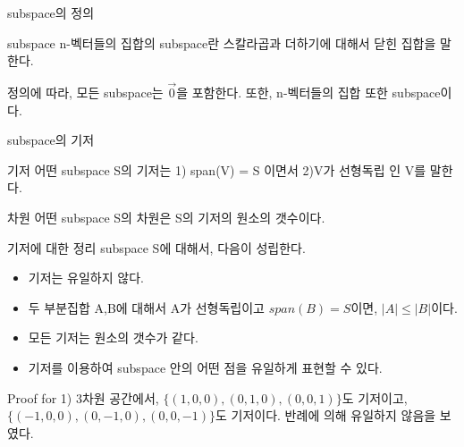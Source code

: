 \documentclass{beamer}
\begin{document}
\begin{frame}{subspace의 정의} 
\begin{block}{subspace}
n-벡터들의 집합의 subspace란 스칼라곱과 더하기에 대해서 닫힌 집합을 말한다. 
\end{block}

정의에 따라, 모든 subspace는 $\vec{0}$을 포함한다. 또한, n-벡터들의 집합 또한 subspace이다. 
\end{frame}


\begin{frame}{subspace의 기저} 
\begin{block}{기저} 
어떤 subspace S의 기저는 1) span(V) = S 이면서 2)V가 선형독립 인 V를 말한다. 
\end{block}
\begin{block}{차원} 
어떤 subspace S의 차원은 S의 기저의 원소의 갯수이다.
\end{block}
\end{frame}

\begin{frame}{기저에 대한 정리} 
subspace S에 대해서, 다음이 성립한다. 
\begin{itemize} 
\item 기저는 유일하지 않다. 
\item 두 부분집합 A,B에 대해서 A가 선형독립이고 $span(B) = S$이면, $|A| \leq |B|$이다. 
\item 모든 기저는 원소의 갯수가 같다. 
\item 기저를 이용하여 subspace 안의 어떤 점을 유일하게 표현할 수 있다. 
\end{itemize}
\end{frame}

\begin{frame}{Proof for 1)}
3차원 공간에서, $\{(1,0,0), (0,1,0), (0,0,1)\}$도 기저이고, $\{(-1,0,0), (0,-1,0), (0,0,-1)\}$도 기저이다. 반례에 의해 유일하지 않음을 보였다. 
\end{frame}
\end{document}
